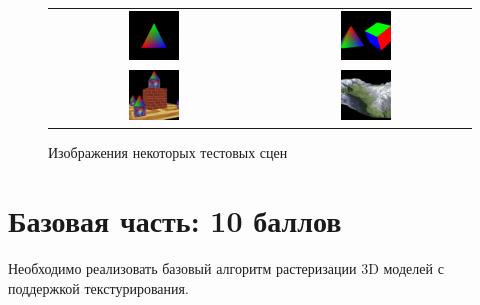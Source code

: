 \documentclass[12pt,subf,href,colorlinks=true]{article}
\begin{document}
\begin{figure}
	\begin{center}
		\begin{tabular}{c c}
			\includegraphics[width=0.25\textwidth]{img/wref_01.png} & 
			\includegraphics[width=0.25\textwidth]{img/wref_03.png} \\ 
			\includegraphics[width=0.25\textwidth]{img/wref_05.png} &
			\includegraphics[width=0.25\textwidth]{img/wref_08.png} \\
		\end{tabular}
		\caption{Изображения некоторых тестовых сцен}
		\label{fig:images}
	\end{center}
\end{figure}

\section{Базовая часть: 10 баллов }

Необходимо реализовать базовый алгоритм растеризации 3D моделей с поддержкой текстурирования.
\end{document}
